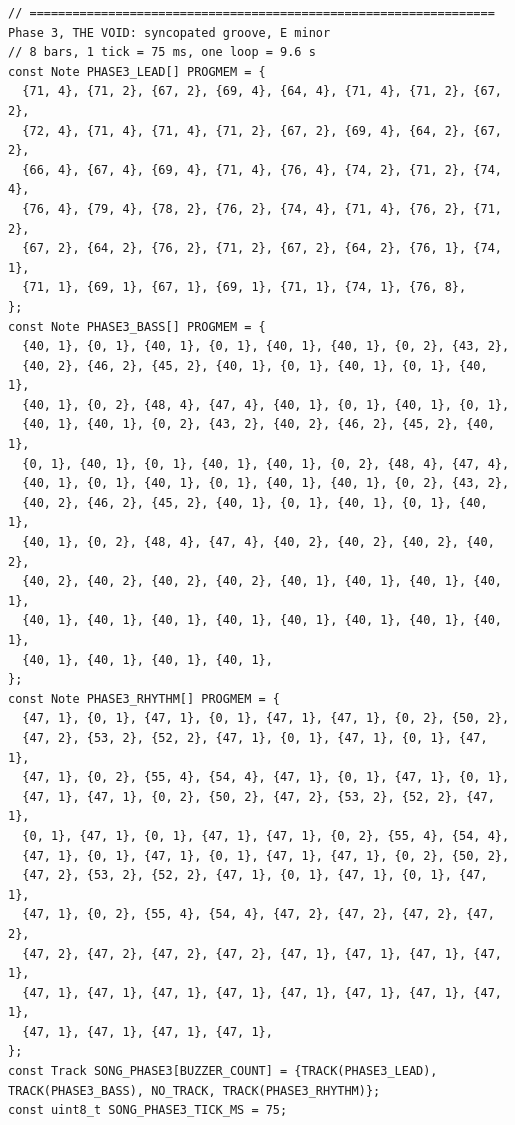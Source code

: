 \documentclass[11pt,a4paper]{article}
\begin{document}
\begin{latin}
\begin{lstlisting}[language=Arduino]
// ================================================================= Phase 3, THE VOID: syncopated groove, E minor
// 8 bars, 1 tick = 75 ms, one loop = 9.6 s
const Note PHASE3_LEAD[] PROGMEM = {
  {71, 4}, {71, 2}, {67, 2}, {69, 4}, {64, 4}, {71, 4}, {71, 2}, {67, 2},
  {72, 4}, {71, 4}, {71, 4}, {71, 2}, {67, 2}, {69, 4}, {64, 2}, {67, 2},
  {66, 4}, {67, 4}, {69, 4}, {71, 4}, {76, 4}, {74, 2}, {71, 2}, {74, 4},
  {76, 4}, {79, 4}, {78, 2}, {76, 2}, {74, 4}, {71, 4}, {76, 2}, {71, 2},
  {67, 2}, {64, 2}, {76, 2}, {71, 2}, {67, 2}, {64, 2}, {76, 1}, {74, 1},
  {71, 1}, {69, 1}, {67, 1}, {69, 1}, {71, 1}, {74, 1}, {76, 8},
};
const Note PHASE3_BASS[] PROGMEM = {
  {40, 1}, {0, 1}, {40, 1}, {0, 1}, {40, 1}, {40, 1}, {0, 2}, {43, 2},
  {40, 2}, {46, 2}, {45, 2}, {40, 1}, {0, 1}, {40, 1}, {0, 1}, {40, 1},
  {40, 1}, {0, 2}, {48, 4}, {47, 4}, {40, 1}, {0, 1}, {40, 1}, {0, 1},
  {40, 1}, {40, 1}, {0, 2}, {43, 2}, {40, 2}, {46, 2}, {45, 2}, {40, 1},
  {0, 1}, {40, 1}, {0, 1}, {40, 1}, {40, 1}, {0, 2}, {48, 4}, {47, 4},
  {40, 1}, {0, 1}, {40, 1}, {0, 1}, {40, 1}, {40, 1}, {0, 2}, {43, 2},
  {40, 2}, {46, 2}, {45, 2}, {40, 1}, {0, 1}, {40, 1}, {0, 1}, {40, 1},
  {40, 1}, {0, 2}, {48, 4}, {47, 4}, {40, 2}, {40, 2}, {40, 2}, {40, 2},
  {40, 2}, {40, 2}, {40, 2}, {40, 2}, {40, 1}, {40, 1}, {40, 1}, {40, 1},
  {40, 1}, {40, 1}, {40, 1}, {40, 1}, {40, 1}, {40, 1}, {40, 1}, {40, 1},
  {40, 1}, {40, 1}, {40, 1}, {40, 1},
};
const Note PHASE3_RHYTHM[] PROGMEM = {
  {47, 1}, {0, 1}, {47, 1}, {0, 1}, {47, 1}, {47, 1}, {0, 2}, {50, 2},
  {47, 2}, {53, 2}, {52, 2}, {47, 1}, {0, 1}, {47, 1}, {0, 1}, {47, 1},
  {47, 1}, {0, 2}, {55, 4}, {54, 4}, {47, 1}, {0, 1}, {47, 1}, {0, 1},
  {47, 1}, {47, 1}, {0, 2}, {50, 2}, {47, 2}, {53, 2}, {52, 2}, {47, 1},
  {0, 1}, {47, 1}, {0, 1}, {47, 1}, {47, 1}, {0, 2}, {55, 4}, {54, 4},
  {47, 1}, {0, 1}, {47, 1}, {0, 1}, {47, 1}, {47, 1}, {0, 2}, {50, 2},
  {47, 2}, {53, 2}, {52, 2}, {47, 1}, {0, 1}, {47, 1}, {0, 1}, {47, 1},
  {47, 1}, {0, 2}, {55, 4}, {54, 4}, {47, 2}, {47, 2}, {47, 2}, {47, 2},
  {47, 2}, {47, 2}, {47, 2}, {47, 2}, {47, 1}, {47, 1}, {47, 1}, {47, 1},
  {47, 1}, {47, 1}, {47, 1}, {47, 1}, {47, 1}, {47, 1}, {47, 1}, {47, 1},
  {47, 1}, {47, 1}, {47, 1}, {47, 1},
};
const Track SONG_PHASE3[BUZZER_COUNT] = {TRACK(PHASE3_LEAD), TRACK(PHASE3_BASS), NO_TRACK, TRACK(PHASE3_RHYTHM)};
const uint8_t SONG_PHASE3_TICK_MS = 75;


\end{lstlisting}
\end{latin}
\end{document}
